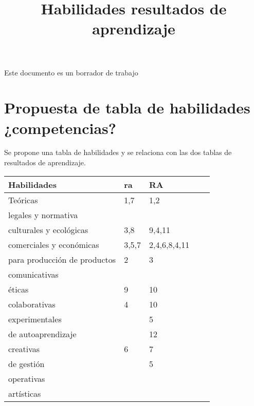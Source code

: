 \documentclass{article}
\title{Habilidades resultados de aprendizaje}
\begin{document}


Este  documento es un borrador de trabajo

\section{Propuesta de tabla de habilidades ¿competencias?}

Se propone una tabla de habilidades y se relaciona con las dos tablas de resultados de aprendizaje.

\begin{table}[h!]
\begin{tabular}{|l|l|l|ll}
\hline 
Habilidades                    & ra    & RA            \\
\hline 
\hline 
Teóricas                       & 1,7   & 1,2      \\
\hline 
legales y   normativa          &       &               \\
\hline 
culturales   y ecológicas      & 3,8   & 9,4,11        \\
\hline 
comerciales   y económicas     & 3,5,7 & 2,4,6,8,4,11  \\
\hline 
para   producción de productos & 2     & 3             \\
\hline 
comunicativas                  &       &               \\
\hline 
éticas                         & 9     & 10            \\
\hline 
colaborativas                  & 4     & 10            \\
\hline 
experimentales                 &       & 5             \\
\hline 
de   autoaprendizaje           &       & 12            \\
\hline 
creativas                      & 6     & 7             \\
\hline 
de   gestión                   &       & 5             \\
\hline 
operativas                     &       &               \\
\hline 
artísticas                     &       &              \\
\hline 
\end{tabular}
\end{table}
\end{document}

